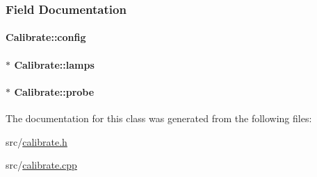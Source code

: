 \subsubsection{\-Field \-Documentation}
\hypertarget{classCalibrate_ab03f352d65f3ad6ae97d4706066b0ea2}{
\paragraph[{config}]{ {\bf \-Calibrate\-::config}}}\label{classCalibrate_ab03f352d65f3ad6ae97d4706066b0ea2}
\hypertarget{classCalibrate_ad21c76042bc2ea7b864c049d5f3ef531}{
\paragraph[{lamps}]{$\ast$ {\bf \-Calibrate\-::lamps}}}\label{classCalibrate_ad21c76042bc2ea7b864c049d5f3ef531}
\hypertarget{classCalibrate_a67a7afddb9f985155355c8d6705d4e63}{
\paragraph[{probe}]{$\ast$ {\bf \-Calibrate\-::probe}}}\label{classCalibrate_a67a7afddb9f985155355c8d6705d4e63}


\-The documentation for this class was generated from the following files\-:\begin{DoxyCompactItemize}
\item 
src/\hyperlink{calibrate_8h}{calibrate.\-h}\item 
src/\hyperlink{calibrate_8cpp}{calibrate.\-cpp}\end{DoxyCompactItemize}
